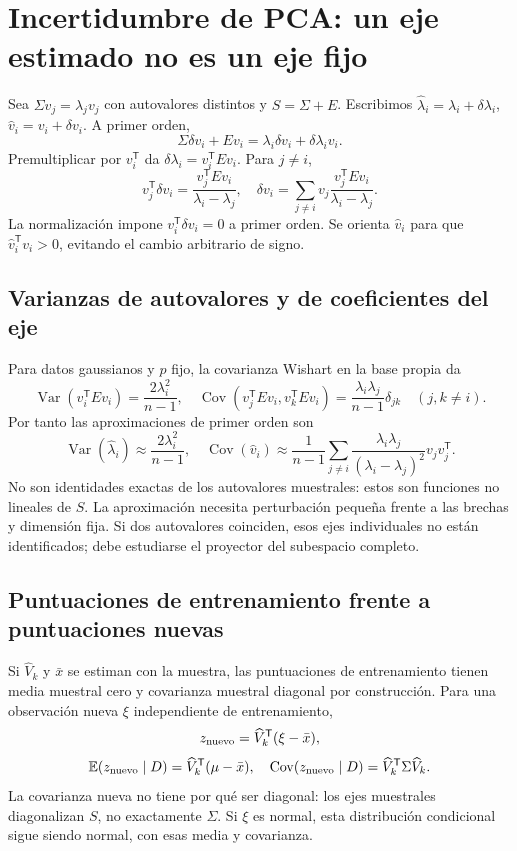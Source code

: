 \documentclass[11pt,a4paper]{article}
\newcommand{\E}{\mathbb E}
\newcommand{\T}{^{\mathsf T}}
\DeclareMathOperator{\Var}{Var}
\DeclareMathOperator{\Cov}{Cov}
\theoremstyle{definition}
\begin{document}
\section{Incertidumbre de PCA: un eje estimado no es un eje fijo}
Sea $\Sigma v_j=\lambda_jv_j$ con autovalores distintos y $S=\Sigma+E$. Escribimos $\widehat\lambda_i=\lambda_i+\delta\lambda_i$, $\widehat v_i=v_i+\delta v_i$. A primer orden,
\[
\Sigma\delta v_i+Ev_i=\lambda_i\delta v_i+\delta\lambda_i v_i.
\]
Premultiplicar por $v_i\T$ da $\delta\lambda_i=v_i\T Ev_i$. Para $j\ne i$,
\[
v_j\T\delta v_i=\frac{v_j\T Ev_i}{\lambda_i-\lambda_j},\quad
\boxed{\delta v_i=\sum_{j\ne i}v_j\frac{v_j\T Ev_i}{\lambda_i-\lambda_j}}.
\]
La normalización impone $v_i\T\delta v_i=0$ a primer orden. Se orienta $\widehat v_i$ para que $\widehat v_i\T v_i>0$, evitando el cambio arbitrario de signo.
\subsection{Varianzas de autovalores y de coeficientes del eje}
Para datos gaussianos y $p$ fijo, la covarianza Wishart en la base propia da
\[
\Var(v_i\T Ev_i)=\frac{2\lambda_i^2}{n-1},\quad
\Cov(v_j\T Ev_i,v_k\T Ev_i)=\frac{\lambda_i\lambda_j}{n-1}\delta_{jk}\quad(j,k\ne i).
\]
Por tanto las aproximaciones de primer orden son
\[
\Var(\widehat\lambda_i)\approx\frac{2\lambda_i^2}{n-1},\quad
\Cov(\widehat v_i)\approx\frac1{n-1}\sum_{j\ne i}
\frac{\lambda_i\lambda_j}{(\lambda_i-\lambda_j)^2}v_jv_j\T.
\]
No son identidades exactas de los autovalores muestrales: estos son funciones no lineales de $S$. La aproximación necesita perturbación pequeña frente a las brechas y dimensión fija. Si dos autovalores coinciden, esos ejes individuales no están identificados; debe estudiarse el proyector del subespacio completo.
\subsection{Puntuaciones de entrenamiento frente a puntuaciones nuevas}
Si $\widehat V_k$ y $\bar x$ se estiman con la muestra, las puntuaciones de entrenamiento tienen media muestral cero y covarianza muestral diagonal por construcción. Para una observación nueva $\xi$ independiente de entrenamiento,
\[
z_{\rm nuevo}=\widehat V_k\T(\xi-\bar x),
\]
\[
\E(z_{\rm nuevo}\mid D)=\widehat V_k\T(\mu-\bar x),\quad
\Cov(z_{\rm nuevo}\mid D)=\widehat V_k\T\Sigma\widehat V_k.
\]
La covarianza nueva no tiene por qué ser diagonal: los ejes muestrales diagonalizan $S$, no exactamente $\Sigma$. Si $\xi$ es normal, esta distribución condicional sigue siendo normal, con esas media y covarianza.
\end{document}
